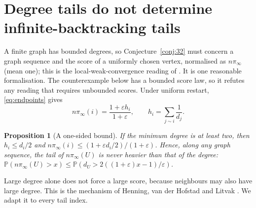 \documentclass[11pt,a4paper]{article}
\newtheorem{proposition}[theorem]{Proposition}
\theoremstyle{definition}\newtheorem{conjecture}{Conjecture}
\theoremstyle{remark}\newtheorem{remark}[theorem]{Remark}
\newcommand{\eps}{\varepsilon}
\begin{document}
\section{Degree tails do not determine infinite-backtracking tails}\label{sec:tails}
A finite graph has bounded degrees, so Conjecture~\ref{conj:32} must concern a graph sequence and the score of a uniformly chosen vertex, normalised as $n\pi_\infty$ (mean one); this is the local-weak-convergence reading of \cite{garavaglia,henning}. It is one reasonable formalisation. The counterexample below has a bounded score law, so it refutes any reading that requires unbounded scores. Under uniform restart, \eqref{eq:endpoints} gives
\begin{equation}\label{eq:localinfty}
 n\pi_\infty(i)=\frac{1+\eps h_i}{1+\eps},\qquad h_i=\sum_{j\sim i}\frac1{d_j}.
\end{equation}

\begin{proposition}[A one-sided bound]\label{prop:degreebound}
If the minimum degree is at least two, then $h_i\leq d_i/2$ and $n\pi_\infty(i)\leq(1+\eps d_i/2)/(1+\eps)$. Hence, along any graph sequence, the tail of $n\pi_\infty(U)$ is never heavier than that of the degree: $\mathbb P(n\pi_\infty(U)>x)\leq\mathbb P(d_U>2((1+\eps)x-1)/\eps)$.
\end{proposition}

Large degree alone does not force a large score, because neighbours may also have large degree. This is the mechanism of Henning, van der Hofstad and Litvak \cite[Section 3]{henning}. We adapt it to every tail index.
\end{document}
